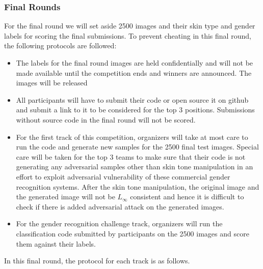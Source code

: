 \documentclass[11pt, oneside]{article}
\begin{document}
\subsubsection{Final Rounds}
For the final round we will set aside 2500 images and their skin type and 
gender labels for scoring the final submissions. To prevent cheating in this 
final round, the following protocols are followed:

\begin{itemize}
    \item The labels for the final round images are held confidentially and 
    will not be made available until the competition ends and winners are 
    announced. The images will be released
    \item All participants will have to submit their code or open source it on 
    github and submit a link to it to be considered for the top 3 positions. 
    Submissions without source code in the final round will not be scored.
    \item For the first track of this competition, organizers will take at most 
    care to run the code and generate new samples for the 2500 final test 
    images. Special care will be taken for the top 3 teams to make sure that 
    their code is not generating any adversarial samples other than skin tone 
    manipulation in an effort to exploit adversarial vulnerability of these 
    commercial gender recognition systems. After the skin tone manipulation, 
    the original image and the generated image will not be $L_{\infty}$ 
    consistent and hence it is difficult to check if there is added adversarial 
    attack on the generated images.
    \item For the gender recognition challenge track, organizers will run the 
    classification code submitted by participants on the 2500 images and score 
    them against their labels.
\end{itemize}


In this final round, the protocol for each track is as follows.
\end{document}
